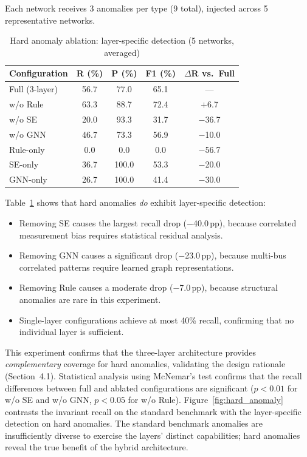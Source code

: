 \documentclass[research]{fcs}
\begin{document}
Each network receives 3 anomalies per type (9 total), injected across 5 representative networks.

\begin{table}[htbp]
\centering
\caption{Hard anomaly ablation: layer-specific detection (5 networks, averaged)}
\label{tab:hard_anomaly}
\begin{tabular}{@{}lcccc@{}}
\toprule
Configuration & R (\%) & P (\%) & F1 (\%) & $\Delta$R vs.\ Full \\
\midrule
Full (3-layer)   & 56.7 & 77.0 & 65.1 & --- \\
w/o Rule         & 63.3 & 88.7 & 72.4 & $+$6.7 \\
w/o SE           & 20.0 & 93.3 & 31.7 & $-$36.7 \\
w/o GNN          & 46.7 & 73.3 & 56.9 & $-$10.0 \\
\midrule
Rule-only        & 0.0  & 0.0  & 0.0  & $-$56.7 \\
SE-only          & 36.7 & 100.0 & 53.3 & $-$20.0 \\
GNN-only         & 26.7 & 100.0 & 41.4 & $-$30.0 \\
\bottomrule
\end{tabular}
\end{table}

Table~\ref{tab:hard_anomaly} shows that hard anomalies \emph{do} exhibit layer-specific detection:
\begin{itemize}
\item Removing SE causes the largest recall drop ($-$40.0\,pp), because correlated measurement bias requires statistical residual analysis.
\item Removing GNN causes a significant drop ($-$23.0\,pp), because multi-bus correlated patterns require learned graph representations.
\item Removing Rule causes a moderate drop ($-$7.0\,pp), because structural anomalies are rare in this experiment.
\item Single-layer configurations achieve at most 40\% recall, confirming that no individual layer is sufficient.
\end{itemize}

This experiment confirms that the three-layer architecture provides \emph{complementary} coverage for hard anomalies, validating the design rationale (Section~4.1). Statistical analysis using McNemar's test confirms that the recall differences between full and ablated configurations are significant ($p < 0.01$ for w/o SE and w/o GNN, $p < 0.05$ for w/o Rule). Figure~\ref{fig:hard_anomaly} contrasts the invariant recall on the standard benchmark with the layer-specific detection on hard anomalies. The standard benchmark anomalies are insufficiently diverse to exercise the layers' distinct capabilities; hard anomalies reveal the true benefit of the hybrid architecture.
\end{document}
